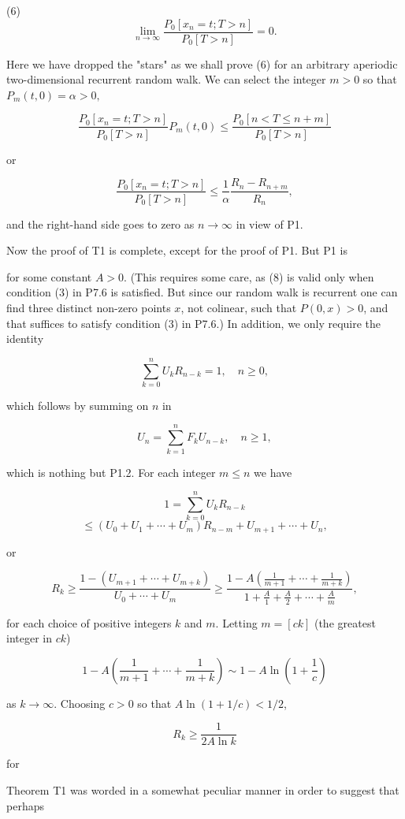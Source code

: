 (6) $$\lim_{n \to \infty} \frac{P_0[x_n = t; T > n]}{P_0[T > n]} = 0.$$

Here we have dropped the "stars" as we shall prove (6) for an arbitrary aperiodic two-dimensional recurrent random walk. We can select the integer $m > 0$ so that $P_m(t,0) = \alpha > 0,$

$$\frac{P_0[x_n = t; T > n]}{P_0[T > n]} P_m(t,0) \leq \frac{P_0[n < T \leq n + m]}{P_0[T > n]}$$

or

$$\frac{P_0[x_n = t; T > n]}{P_0[T > n]} \leq \frac{1}{\alpha} \frac{R_n - R_{n+m}}{R_n},$$

and the right-hand side goes to zero as $n \to \infty$ in view of P1.

Now the proof of T1 is complete, except for the proof of P1. But P1 is

for some constant $A > 0$. (This requires some care, as (8) is valid only when condition (3) in P7.6 is satisfied. But since our random walk is recurrent one can find three distinct non-zero points $x$, not colinear, such that $P(0,x) > 0$, and that suffices to satisfy condition (3) in P7.6.) In addition, we only require the identity

$$\sum_{k=0}^{n} U_k R_{n-k} = 1, \quad n \geq 0,$$

which follows by summing on $n$ in

$$U_n = \sum_{k=1}^{n} F_k U_{n-k}, \quad n \geq 1,$$

which is nothing but P1.2. For each integer $m \leq n$ we have

$$1 = \sum_{k=0}^{n} U_k R_{n-k}$$
$$\leq (U_0 + U_1 + \cdots + U_m) R_{n-m} + U_{m+1} + \cdots + U_n,$$

or

$$R_k \geq \frac{1 - (U_{m+1} + \cdots + U_{m+k})}{U_0 + \cdots + U_m} \geq \frac{1 - A \left( \frac{1}{m+1} + \cdots + \frac{1}{m+k} \right)}{1 + \frac{A}{1} + \frac{A}{2} + \cdots + \frac{A}{m}},$$

for each choice of positive integers $k$ and $m$. Letting $m = [ck]$ (the greatest integer in $ck$)

$$1 - A \left( \frac{1}{m+1} + \cdots + \frac{1}{m+k} \right) \sim 1 - A \ln \left( 1 + \frac{1}{c} \right)$$

as $k \to \infty$. Choosing $c > 0$ so that $A \ln (1 + 1/c) < 1/2$,

$$R_k \geq \frac{1}{2A \ln k}$$

for

Theorem T1 was worded in a somewhat peculiar manner in order to suggest that perhaps

